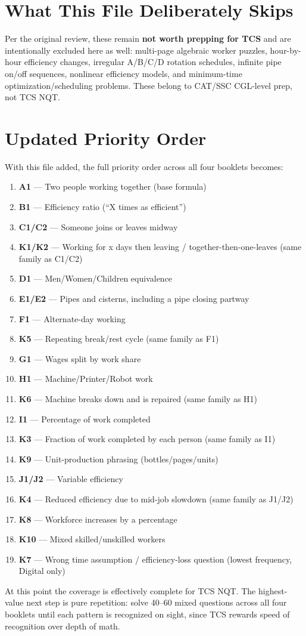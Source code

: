 \documentclass[11pt]{article}
\begin{document}
\section*{What This File Deliberately Skips}

Per the original review, these remain \textbf{not worth prepping for TCS} and are intentionally
excluded here as well: multi-page algebraic worker puzzles, hour-by-hour efficiency changes,
irregular A/B/C/D rotation schedules, infinite pipe on/off sequences, nonlinear efficiency models,
and minimum-time optimization/scheduling problems. These belong to CAT/SSC CGL-level prep, not TCS
NQT.

\section*{Updated Priority Order}

With this file added, the full priority order across all four booklets becomes:

\begin{enumerate}[leftmargin=1.4em]
  \item \textbf{A1} --- Two people working together (base formula)
  \item \textbf{B1} --- Efficiency ratio (``X times as efficient'')
  \item \textbf{C1/C2} --- Someone joins or leaves midway
  \item \textbf{K1/K2} --- Working for x days then leaving / together-then-one-leaves (same family
  as C1/C2)
  \item \textbf{D1} --- Men/Women/Children equivalence
  \item \textbf{E1/E2} --- Pipes and cisterns, including a pipe closing partway
  \item \textbf{F1} --- Alternate-day working
  \item \textbf{K5} --- Repeating break/rest cycle (same family as F1)
  \item \textbf{G1} --- Wages split by work share
  \item \textbf{H1} --- Machine/Printer/Robot work
  \item \textbf{K6} --- Machine breaks down and is repaired (same family as H1)
  \item \textbf{I1} --- Percentage of work completed
  \item \textbf{K3} --- Fraction of work completed by each person (same family as I1)
  \item \textbf{K9} --- Unit-production phrasing (bottles/pages/units)
  \item \textbf{J1/J2} --- Variable efficiency
  \item \textbf{K4} --- Reduced efficiency due to mid-job slowdown (same family as J1/J2)
  \item \textbf{K8} --- Workforce increases by a percentage
  \item \textbf{K10} --- Mixed skilled/unskilled workers
  \item \textbf{K7} --- Wrong time assumption / efficiency-loss question (lowest frequency, Digital
  only)
\end{enumerate}

\noindent At this point the coverage is effectively complete for TCS NQT. The highest-value next step
is pure repetition: solve 40--60 mixed questions across all four booklets until each pattern is
recognized on sight, since TCS rewards speed of recognition over depth of math.
\end{document}
